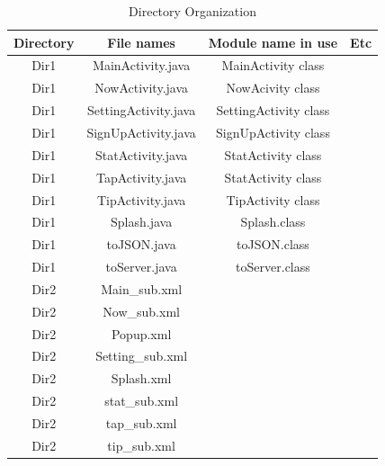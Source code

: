 \documentclass[conference]{IEEEtran}
\begin{document}
\begin{table}[H]
\caption{Directory Organization}
\begin{tabular}{|c|c|c|c|}\hline

Directory & File names & Module name in use & Etc \\ \hline \hline

Dir1 & MainActivity.java & MainActivity class & \\ \hline 

Dir1& NowActivity.java & NowAcivity class & \\ \hline 

Dir1 & SettingActivity.java & SettingActivity class & \\ \hline 

Dir1 & SignUpActivity.java & SignUpActivity class & \\  \hline 

Dir1 & StatActivity.java & StatActivity class & \\ \hline 

Dir1& TapActivity.java & StatActivity class & \\ \hline 

Dir1 & TipActivity.java & TipActivity class & \\ \hline 

Dir1 & Splash.java & Splash.class & \\ \hline

Dir1 & toJSON.java & toJSON.class & \\ \hline

Dir1 & toServer.java & toServer.class & \\ \hline

Dir2& Main\_{}sub.xml & & \\ \hline 

Dir2& Now\_{}sub.xml & &  \\ \hline

Dir2 & Popup.xml & & \\ \hline

Dir2& Setting\_{}sub.xml & & \\ \hline 

Dir2 & Splash.xml & & \\ \hline

Dir2 & stat\_{}sub.xml & & \\ \hline 

Dir2 & tap\_{}sub.xml & & \\ \hline

Dir2 & tip\_{}sub.xml & & \\ \hline


\end{tabular}
\end{table}
\end{document}
